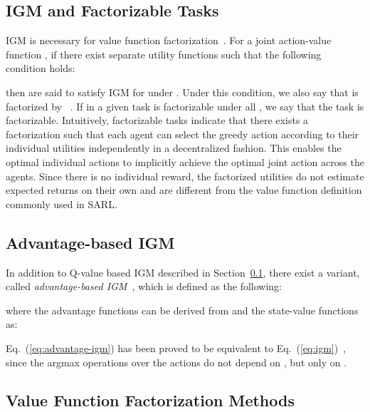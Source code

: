 \documentclass[twoside,11pt]{article}
\newcounter{definition0}
\begin{document}
\subsection{IGM and Factorizable Tasks}
\label{subsec:background_igm_and_factorizable_task}

IGM is necessary for value function factorization~\citep{Son2019QTRAN}. For a joint action-value function , if there exist  separate utility functions  such that the following condition holds:

then  are said to satisfy IGM for  under . 
Under this condition, we also say that  is factorized by ~\citep{Son2019QTRAN}. If  in a given task is factorizable under all , we say that the task is factorizable. Intuitively, factorizable tasks indicate that there exists a factorization such that each agent can select the greedy action according to their individual utilities  independently in a decentralized fashion. This enables the optimal individual actions to implicitly achieve the optimal joint action across the  agents. Since there is no individual reward, the factorized utilities do not estimate expected returns on their own \citep{Guestrin2001Utility} and are different from the value function definition commonly used in SARL.



\subsection{Advantage-based IGM}
\label{subsec:advantage_based_igm}

In addition to Q-value based IGM described in Section~\ref{subsec:background_igm_and_factorizable_task}, there exist a variant, called \textit{advantage-based IGM}~\citep{Wang2020QPLEX}, which is defined as the following:

where the advantage functions  can be derived from  and the state-value functions  as:



Eq.~(\ref{eq:advantage-igm}) has been proved to be equivalent to Eq.~(\ref{eq:igm})~\citep{Wang2020QPLEX}, since the argmax operations over the actions do not depend on , but only on .



\subsection{Value Function Factorization Methods}
\label{subsec:background_value_factorization_methods}
\end{document}
